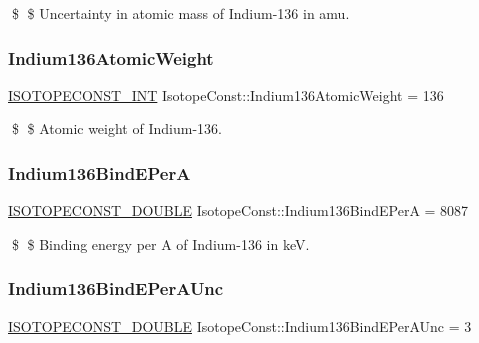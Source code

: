 \$ \$ Uncertainty in atomic mass of Indium-\/136 in amu. \mbox{\label{group___isotope_const-_indium-_in136_ga907eeca22e1cc11635290a6c4a50c3d5}} 
\subsubsection{\texorpdfstring{Indium136\+Atomic\+Weight}{Indium136AtomicWeight}}
{\footnotesize\ttfamily \mbox{\hyperlink{group___isotope_const-_macros_ga5f18360b3e99483a35c32d789e62621c}{I\+S\+O\+T\+O\+P\+E\+C\+O\+N\+S\+T\+\_\+\+I\+NT}} Isotope\+Const\+::\+Indium136\+Atomic\+Weight = 136}

\$ \$ Atomic weight of Indium-\/136. \mbox{\label{group___isotope_const-_indium-_in136_ga6c7b653d6bc47130a6fdfd2e40d37dad}} 
\subsubsection{\texorpdfstring{Indium136\+Bind\+E\+PerA}{Indium136BindEPerA}}
{\footnotesize\ttfamily \mbox{\hyperlink{group___isotope_const-_macros_ga8f45a7272ce02c0b4c65c44636ed719a}{I\+S\+O\+T\+O\+P\+E\+C\+O\+N\+S\+T\+\_\+\+D\+O\+U\+B\+LE}} Isotope\+Const\+::\+Indium136\+Bind\+E\+PerA = 8087}

\$ \$ Binding energy per A of Indium-\/136 in keV. \mbox{\label{group___isotope_const-_indium-_in136_ga37de877c5ff5f1e94f40e58146874624}} 
\subsubsection{\texorpdfstring{Indium136\+Bind\+E\+Per\+A\+Unc}{Indium136BindEPerAUnc}}
{\footnotesize\ttfamily \mbox{\hyperlink{group___isotope_const-_macros_ga8f45a7272ce02c0b4c65c44636ed719a}{I\+S\+O\+T\+O\+P\+E\+C\+O\+N\+S\+T\+\_\+\+D\+O\+U\+B\+LE}} Isotope\+Const\+::\+Indium136\+Bind\+E\+Per\+A\+Unc = 3}

